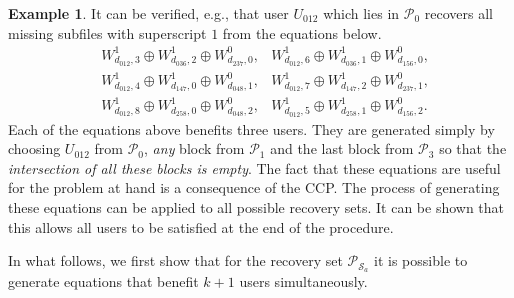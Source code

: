 \documentclass[journal,twocolumn]{IEEEtran}
\theoremstyle{definition}
\newtheorem{example}{Example}
\newcommand{\calP}{\mathcal{P}}
\newcommand{\calS}{\mathcal{S}}
\begin{document}
\begin{example}
It can be verified, e.g., that user $U_{012}$ which lies in $\calP_0$ recovers all missing subfiles with superscript $1$ from the equations below.
	\begin{align*}
		&W^1_{d_{012},3}\oplus W^1_{d_{036},2}\oplus W^0_{d_{237},0},&
		W^1_{d_{012},6}\oplus W^1_{d_{036},1}\oplus W^0_{d_{156},0},\\	
		&W^1_{d_{012},4}\oplus W^1_{d_{147},0}\oplus W^0_{d_{048},1},&
		W^1_{d_{012},7}\oplus W^1_{d_{147},2}\oplus W^0_{d_{237},1},\\
		&W^1_{d_{012},8}\oplus W^1_{d_{258},0}\oplus W^0_{d_{048},2},&
		W^1_{d_{012},5}\oplus W^1_{d_{258},1}\oplus W^0_{d_{156},2}.
	\end{align*}
Each of the equations above benefits three users. They are generated simply by choosing $U_{012}$ from $\calP_0$, {\it any} block from $\calP_1$ and the last block from $\calP_3$ so that the {\it intersection of all these blocks is empty}. The fact that these equations are useful for the problem at hand is a consequence of the CCP. The process of generating these equations can be applied to all possible recovery sets. It can be shown that this allows all users to be satisfied at the end of the procedure.
	
\end{example}


In what follows, we first show that for the recovery set $\calP_{\calS_a}$ it is possible to generate equations that benefit $k+1$ users simultaneously.
\end{document}
